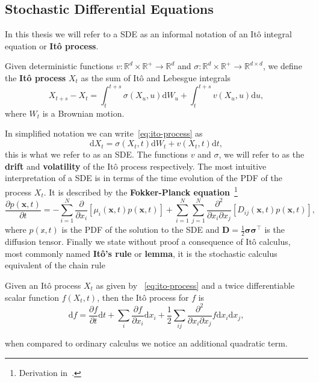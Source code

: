 \subsection{Stochastic Differential Equations}
In this thesis we will refer to a SDE as an informal notation of an It\^ o integral equation or \textbf{It\^ o process}. 
\begin{definition}[It\^ o process]
	Given deterministic functions $v: \mathbb{R}^{d} \times \mathbb{R}^{+} \rightarrow \mathbb{R}^{d}$ and $\sigma: \mathbb{R}^{d} \times \mathbb{R}^{+} \rightarrow \mathbb{R}^{d \times d}$, we define the \textbf{It\^ o process} $X_t$ as the sum of It\^ o and Lebesgue integrals
	\begin{equation}
		\label{eq:ito-process}
		X_{t+s}-X_{t}=\int_{t}^{t+s} \sigma\left(X_{u}, u\right) \mathrm{d} W_{u} + \int_{t}^{t+s} v\left(X_{u}, u\right) \mathrm{d} u,
	\end{equation}
	where $W_t$ is a Brownian motion.
\end{definition}
In simplified notation we can write~\eqref{eq:ito-process} as
\begin{equation}
	\mathrm{d} X_t = \sigma \left(X_{t}, t\right)\mathrm{d}W_t + v\left(X_{t}, t\right) \mathrm{d}t,
\end{equation}
this is what we refer to as an SDE. The functions $v$ and $\sigma$, we will refer to as the \textbf{drift} and \textbf{volatility} of the It\^ o process respectively. The most intuitive interpretation of a SDE is in terms of the time evolution of the PDF of the process $X_t$. It is described by the \textbf{Fokker-Planck equation}~\footnote{Derivation in~\cite{sarkka2019applied}.} 
\begin{equation}
	\frac{\partial p(\mathbf{x}, t)}{\partial t}=
	-\sum_{i=1}^{N} \frac{\partial}{\partial x_{i}}\left[\mu_{i}(\mathbf{x}, t) p(\mathbf{x}, t)\right]
	+\sum_{i=1}^{N} \sum_{j=1}^{N} \frac{\partial^{2}}{\partial x_{i} \partial x_{j}}\left[D_{i j}(\mathbf{x}, t) p(\mathbf{x}, t)\right],
\end{equation}
where $p(\mathbb{x}, t)$ is the PDF of the solution to the SDE and $\mathbf{D}=\frac{1}{2} \boldsymbol{\sigma} \boldsymbol{\sigma}^{\top}$ is the diffusion tensor. Finally we state without proof a consequence of It\^ o calculus, most commonly named \textbf{It\^ o's rule} or \textbf{lemma}, it is the stochastic calculus equivalent of the chain rule
\begin{lemma}[It\^ o's lemma]
	Given an It\^ o process $X_t$ as given by ~\eqref{eq:ito-process} and a twice differentiable scalar function $f(X_t, t)$, then the It\^ o process for $f$ is
	\begin{equation}
		\mathrm{d} f = \frac{\partial f}{\partial t}\mathrm{d}t + \sum_i \frac{\partial f}{\partial x_i} \mathrm{d}x_i + \frac{1}{2}\sum_{ij} \frac{\partial^{2}}{\partial x_{i} \partial x_{j}} f \mathrm{d}x_i \mathrm{d}x_j,
	\end{equation}
\end{lemma}
when compared to ordinary calculus we notice an additional quadratic term.


